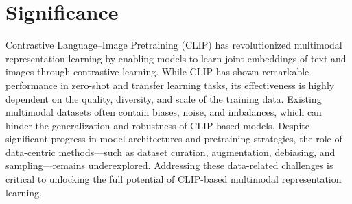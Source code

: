 \documentclass[11pt,letterpaper]{article}
\begin{document}
\section{Significance}
Contrastive Language–Image Pretraining (CLIP) has revolutionized multimodal representation learning by enabling models to learn joint embeddings of text and images through contrastive learning. While CLIP has shown remarkable performance in zero-shot and transfer learning tasks, its effectiveness is highly dependent on the quality, diversity, and scale of the training data. Existing multimodal datasets often contain biases, noise, and imbalances, which can hinder the generalization and robustness of CLIP-based models. Despite significant progress in model architectures and pretraining strategies, the role of data-centric methods—such as dataset curation, augmentation, debiasing, and sampling—remains underexplored. Addressing these data-related challenges is critical to unlocking the full potential of CLIP-based multimodal representation learning.
\end{document}
